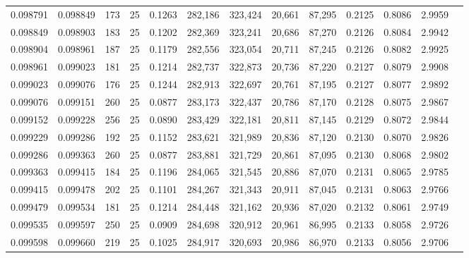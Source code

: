 \begin{tabular}{rrrrrrrrrrrrr}
0.098791 & 0.098849 &   173 &  25 &                                     0.1263 & 282,186 & 323,424 &  20,661 &  87,295 & 0.2125 & 0.8086 & 2.9959 \\
0.098849 & 0.098903 &   183 &  25 &                                     0.1202 & 282,369 & 323,241 &  20,686 &  87,270 & 0.2126 & 0.8084 & 2.9942 \\
0.098904 & 0.098961 &   187 &  25 &                                     0.1179 & 282,556 & 323,054 &  20,711 &  87,245 & 0.2126 & 0.8082 & 2.9925 \\
0.098961 & 0.099023 &   181 &  25 &                                     0.1214 & 282,737 & 322,873 &  20,736 &  87,220 & 0.2127 & 0.8079 & 2.9908 \\
0.099023 & 0.099076 &   176 &  25 &                                     0.1244 & 282,913 & 322,697 &  20,761 &  87,195 & 0.2127 & 0.8077 & 2.9892 \\
0.099076 & 0.099151 &   260 &  25 &                                     0.0877 & 283,173 & 322,437 &  20,786 &  87,170 & 0.2128 & 0.8075 & 2.9867 \\
0.099152 & 0.099228 &   256 &  25 &                                     0.0890 & 283,429 & 322,181 &  20,811 &  87,145 & 0.2129 & 0.8072 & 2.9844 \\
0.099229 & 0.099286 &   192 &  25 &                                     0.1152 & 283,621 & 321,989 &  20,836 &  87,120 & 0.2130 & 0.8070 & 2.9826 \\
0.099286 & 0.099363 &   260 &  25 &                                     0.0877 & 283,881 & 321,729 &  20,861 &  87,095 & 0.2130 & 0.8068 & 2.9802 \\
0.099363 & 0.099415 &   184 &  25 &                                     0.1196 & 284,065 & 321,545 &  20,886 &  87,070 & 0.2131 & 0.8065 & 2.9785 \\
0.099415 & 0.099478 &   202 &  25 &                                     0.1101 & 284,267 & 321,343 &  20,911 &  87,045 & 0.2131 & 0.8063 & 2.9766 \\
0.099479 & 0.099534 &   181 &  25 &                                     0.1214 & 284,448 & 321,162 &  20,936 &  87,020 & 0.2132 & 0.8061 & 2.9749 \\
0.099535 & 0.099597 &   250 &  25 &                                     0.0909 & 284,698 & 320,912 &  20,961 &  86,995 & 0.2133 & 0.8058 & 2.9726 \\
0.099598 & 0.099660 &   219 &  25 &                                     0.1025 & 284,917 & 320,693 &  20,986 &  86,970 & 0.2133 & 0.8056 & 2.9706 \\

\end{tabular}
